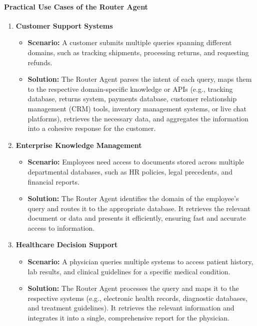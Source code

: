 \documentclass[12pt]{article}
\begin{document}
\newpage
\paragraph{Practical Use Cases of the Router Agent}
\begin{enumerate}
    \item \textbf{Customer Support Systems}
 \begin{itemize}
    \item \textbf{Scenario:} A customer submits multiple queries spanning different domains, such as tracking shipments, processing returns, and requesting refunds.
    \item \textbf{Solution:} The Router Agent parses the intent of each query, maps them to the respective domain-specific knowledge or APIs (e.g., tracking database, returns system, payments database, customer relationship management (CRM) tools, inventory management systems, or live chat platforms), retrieves the necessary data, and aggregates the information into a cohesive response for the customer.
\end{itemize}
    \item \textbf{Enterprise Knowledge Management}
    \begin{itemize}
        \item \textbf{Scenario:} Employees need access to documents stored across multiple departmental databases, such as HR policies, legal precedents, and financial reports.
        \item \textbf{Solution:} The Router Agent identifies the domain of the employee’s query and routes it to the appropriate database. It retrieves the relevant document or data and presents it efficiently, ensuring fast and accurate access to information.
    \end{itemize}
    \item \textbf{Healthcare Decision Support}
    \begin{itemize}
        \item \textbf{Scenario:} A physician queries multiple systems to access patient history, lab results, and clinical guidelines for a specific medical condition.
        \item \textbf{Solution:} The Router Agent processes the query and maps it to the respective systems (e.g., electronic health records, diagnostic databases, and treatment guidelines). It retrieves the relevant information and integrates it into a single, comprehensive report for the physician.
    \end{itemize}

\end{enumerate}
\end{document}
